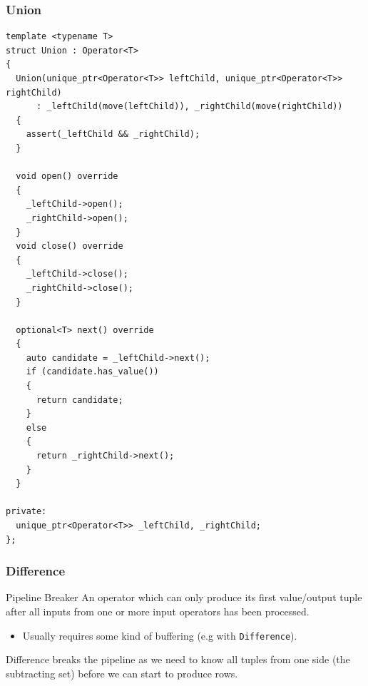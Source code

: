 \subsubsection{Union}
\begin{verbatim}
template <typename T>
struct Union : Operator<T>
{
  Union(unique_ptr<Operator<T>> leftChild, unique_ptr<Operator<T>> rightChild)
      : _leftChild(move(leftChild)), _rightChild(move(rightChild))
  {
    assert(_leftChild && _rightChild);
  }

  void open() override
  {
    _leftChild->open();
    _rightChild->open();
  }
  void close() override
  {
    _leftChild->close();
    _rightChild->close();
  }

  optional<T> next() override
  {
    auto candidate = _leftChild->next();
    if (candidate.has_value())
    {
      return candidate;
    }
    else
    {
      return _rightChild->next();
    }
  }

private:
  unique_ptr<Operator<T>> _leftChild, _rightChild;
};
\end{verbatim}

\subsubsection{Difference}

\begin{definitionbox}{Pipeline Breaker}
  An operator which can only produce its first value/output tuple after all inputs from one or more input operators has been processed.
  \begin{itemize}
    \item Usually requires some kind of buffering (e.g with \texttt{Difference}).
  \end{itemize}
\end{definitionbox}

Difference breaks the pipeline as we need to know all tuples from one side (the subtracting set) before we can start to produce rows.

